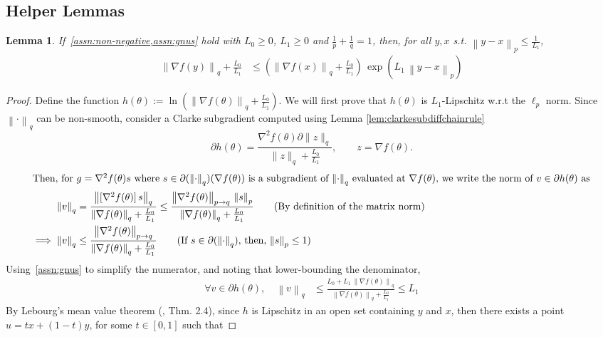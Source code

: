 \documentclass{article}
\newtheorem{lemma}{Lemma}
\newcommand{\norm}[1]{\left\|#1 \right\|}
\begin{document}
\subsection{Helper Lemmas}
\label{app:adam-helper-lemmas-gnus }
\begin{lemma}
If~\cref{assn:non-negative,assn:gnus} hold with $L_0 \geq 0$, $L_1 \geq 0$ and $\frac{1}{p} + \frac{1}{q} = 1$, then, for all $y, x$ s.t. $\norm{y - x}_p \leq \frac{1}{L_1}$, 
\begin{align*}
\norm{\nabla f(y)}_q  + \frac{L_0}{L_1} & \leq \left(\norm{\nabla f(x)}_q + \frac{L_0}{L_1} \right) \, \exp\left(L_1 \, \norm{y - x}_p \right) 
\end{align*}
\label{lemma:grad-multi-lip-gnus}
\end{lemma}
\begin{proof}
Define the function $h(\theta) := \ln(\norm{\nabla f(\theta)}_q  + \frac{L_0}{L_1})$. We will first prove that $h(\theta)$ is $L_1$-Lipschitz w.r.t the $\ell_{p}$ norm. Since $\norm{\cdot}_q$ can be non-smooth, consider a Clarke subgradient computed using Lemma \ref{lem:clarkesubdiffchainrule}
\[
\partial h(\theta) = \frac{\nabla^2 f(\theta)  \partial \|z\|_q}{\|z\|_q+\frac{L_0}{L_1}}, \qquad z =  \nabla f(\theta).
\]
\begin{align*}
\intertext{Then, for $g = \nabla^2 f(\theta) s$ where $s \in \partial(\norm{\cdot}_q)(\nabla f(\theta))$ is a subgradient of $\norm{\cdot}_{q}$ evaluated at $\nabla f(\theta)$, we write the norm of $v\in \partial h(\theta)$ as}
\norm{v}_{q} &= \frac{\norm{[\nabla^2 f(\theta)] \, s}_q}{\norm{\nabla f(\theta)}_q + \frac{L_0}{L_1}} \leq \frac{\norm{\nabla^2 f(\theta)}_{p \to q} \, \norm{s}_{p}}{\norm{\nabla f(\theta)}_q + \frac{L_0}{L_1}} \tag{By definition of the matrix norm} \\
\implies \norm{v}_{q} & \leq \frac{\norm{\nabla^2 f(\theta)}_{p \to q}}{\norm{\nabla f(\theta)}_q + \frac{L_0}{L_1}} \tag{If $s \in \partial(\norm{\cdot}_q)$, then, $\norm{s}_p \leq 1$} \\
\end{align*}
Using~\cref{assn:gnus} to simplify the numerator, and noting that lower-bounding the denominator, 
\begin{align*}
\forall v \in \partial{h}(\theta), \quad \norm{v}_q & \leq \frac{L_0 + L_1 \, \norm{\nabla f(\theta)}_q}{\norm{\nabla f(\theta)}_q+\frac{L_0}{L_1}} \leq L_1    
\end{align*}
By Lebourg's mean value theorem (\cite{clarke1998nonsmooth}, Thm. 2.4), since $h$ is Lipschitz in an open set containing $y$ and $x$, then there exists a point $u = tx+(1-t)y$, for some $t\in[0,1]$ such that 

\end{proof}
\end{document}
